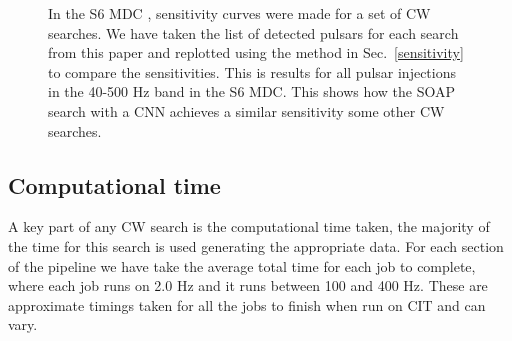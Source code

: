 \begin{figure}
	\caption{\label{machine:results:s6mdc} In the S6 \ac{MDC} \cite{walsh2016ComparisonMethods}, sensitivity curves were made for a set of \ac{CW} searches. 
		We have taken the list of detected pulsars for each search from this paper \cite{walsh2016ComparisonMethods} and replotted using the method in Sec.~\ref{sensitivity} to compare the sensitivities. 
		This is results for all pulsar injections in the 40-500 Hz band in the S6 \ac{MDC}.
		This shows how the SOAP search with a \ac{CNN} achieves a similar sensitivity some other \ac{CW} searches. 
	}
	
\end{figure}


\subsection{\label{results:timing} Computational time}

A key part of any \ac{CW} search is the computational time taken, the majority of the time for this search is used generating the appropriate data. 
For each section of the pipeline we have take the average total time for each job to complete, where each job runs on 2.0 Hz and it runs between 100 and 400 Hz. These are approximate timings taken for all the jobs to finish when run on CIT and can vary.

